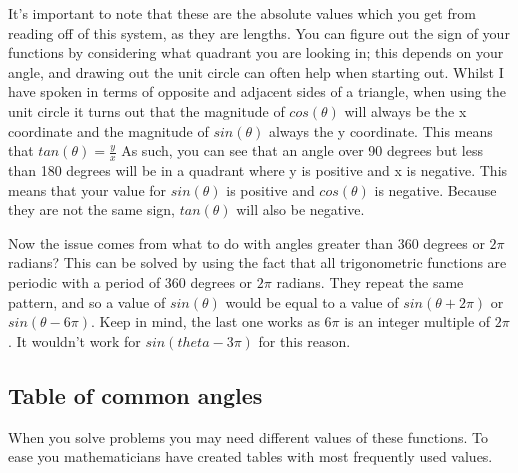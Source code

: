 \documentclass[
  12pt,
  a4paper, oneside]{starmastarticle}
\begin{document}
It's important to note that these are the absolute values which you get
from reading off of this system, as they are lengths. You can figure out
the sign of your functions by considering what quadrant you are looking
in; this depends on your angle, and drawing out the unit circle can
often help when starting out. Whilst I have spoken in terms of opposite
and adjacent sides of a triangle, when using the unit circle it turns
out that the magnitude of \(cos(\theta)\) will always be the x
coordinate and the magnitude of \(sin(\theta)\) always the y coordinate.
This means that \(tan(\theta)= \frac{y}{x}\) As such, you can see that
an angle over 90 degrees but less than 180 degrees will be in a quadrant
where y is positive and x is negative. This means that your value for
\(sin(\theta)\) is positive and \(cos(\theta)\) is negative. Because
they are not the same sign, \(tan(\theta)\) will also be negative.

Now the issue comes from what to do with angles greater than 360 degrees
or \(2 \pi\) radians? This can be solved by using the fact that all
trigonometric functions are periodic with a period of 360 degrees or
\(2\pi\) radians. They repeat the same pattern, and so a value of
\(sin(\theta)\) would be equal to a value of \(sin(\theta+2\pi)\) or
\(sin(\theta-6\pi)\). Keep in mind, the last one works as \(6\pi\) is an
integer multiple of \(2\pi\). It wouldn't work for \(sin(theta-3\pi)\)
for this reason.

\hypertarget{table-of-common-angles}{%
\subsection{Table of common angles}\label{table-of-common-angles}}

When you solve problems you may need different values of these
functions. To ease you mathematicians have created tables with most
frequently used values.
\end{document}
